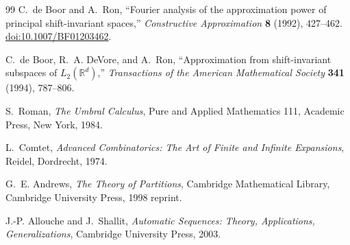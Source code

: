 \documentclass[11pt]{article}
\theoremstyle{definition}
\theoremstyle{remark}
\newcommand{\R}{\mathbb{R}}
\newcommand{\1}{\mathbf{1}}
\begin{document}
\begin{thebibliography}{99}
C.~de Boor and A.~Ron,
``Fourier analysis of the approximation power of principal shift-invariant
spaces,''
\emph{Constructive Approximation} \textbf{8} (1992), 427--462.
\href{https://doi.org/10.1007/BF01203462}{doi:10.1007/BF01203462}.

C.~de Boor, R.~A. DeVore, and A.~Ron,
``Approximation from shift-invariant subspaces of $L_2(\R^d)$,''
\emph{Transactions of the American Mathematical Society} \textbf{341} (1994),
787--806.

S.~Roman,
\emph{The Umbral Calculus},
Pure and Applied Mathematics 111, Academic Press, New York, 1984.

L.~Comtet,
\emph{Advanced Combinatorics: The Art of Finite and Infinite Expansions},
Reidel, Dordrecht, 1974.

G.~E. Andrews,
\emph{The Theory of Partitions},
Cambridge Mathematical Library, Cambridge University Press, 1998 reprint.

J.-P. Allouche and J.~Shallit,
\emph{Automatic Sequences: Theory, Applications, Generalizations},
Cambridge University Press, 2003.

\end{thebibliography}
\end{document}
